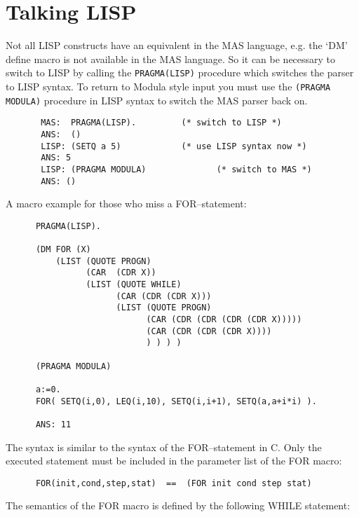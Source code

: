 \section{Talking LISP}

Not all LISP constructs have an equivalent in the 
MAS language, 
e.g. the `DM' define macro is not available in the 
MAS language.
So it can be necessary to switch to LISP by calling the 
\verb/PRAGMA(LISP)/ procedure which switches  
the parser to LISP syntax.
To return to Modula style input you must use the 
\verb/(PRAGMA MODULA)/
procedure in LISP syntax to switch the 
MAS parser back on. 

\begin{verbatim}
       MAS:  PRAGMA(LISP).         (* switch to LISP *)
       ANS:  ()                 
       LISP: (SETQ a 5)            (* use LISP syntax now *)
       ANS: 5
       LISP: (PRAGMA MODULA)              (* switch to MAS *)
       ANS: ()
\end{verbatim}

A macro example for those who miss a FOR--statement:

\begin{verbatim}
      PRAGMA(LISP).

      (DM FOR (X)
          (LIST (QUOTE PROGN)
                (CAR  (CDR X)) 
                (LIST (QUOTE WHILE)
                      (CAR (CDR (CDR X)))
                      (LIST (QUOTE PROGN)
                            (CAR (CDR (CDR (CDR (CDR X)))))
                            (CAR (CDR (CDR (CDR X))))
                            ) ) ) )

      (PRAGMA MODULA)

      a:=0.
      FOR( SETQ(i,0), LEQ(i,10), SETQ(i,i+1), SETQ(a,a+i*i) ).

      ANS: 11
\end{verbatim}

The syntax is similar to the syntax of the 
FOR--statement in C.
Only the executed statement must be included in the 
parameter list  of the FOR macro:

\begin{verbatim}
      FOR(init,cond,step,stat)  ==  (FOR init cond step stat)
\end{verbatim}

The semantics of the FOR macro is defined by the following 
WHILE statement:

